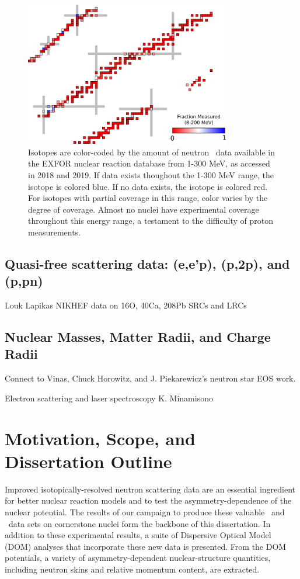 \begin{figure}[h]
    \centering
    \includegraphics[width=0.8\textwidth]{figures/RCSChart.png}
    \caption[Landscape of existing proton \rxn\ data in 2019]
    {Isotopes are color-coded by the amount of neutron \tot\ data available in the EXFOR nuclear
        reaction database from 1-300 MeV, as accessed in 2018 and 2019. If data exists thoughout the 1-300 MeV range, the isotope
        is colored blue. If no data exists, the isotope is colored red. For
        isotopes with partial coverage in this range, color varies by the degree
        of coverage. Almost no nuclei have experimental coverage throughout this energy
        range, a testament to the difficulty of proton \rxn measurements.}
    \label{RCSChart}
\end{figure}



\subsection{Quasi-free scattering data: (e,e'p), (p,2p), and (p,pn)}
Louk Lapikas
NIKHEF data on 16O, 40Ca, 208Pb
SRCs and LRCs

\subsection{Nuclear Masses, Matter Radii, and Charge Radii}
Connect to Vinas, Chuck Horowitz, and J. Piekarewicz's neutron star EOS work.

Electron scattering and laser spectroscopy
K. Minamisono

\section{Motivation, Scope, and Dissertation Outline}
Improved isotopically-resolved neutron scattering data are an essential ingredient
for better nuclear reaction models and to test the asymmetry-dependence of the
nuclear potential. The results of our campaign to produce these valuable
\tot\ and \el\ data sets on cornerstone nuclei form the backbone of this dissertation.
In addition to these experimental results, a suite of Dispersive Optical Model (DOM) analyses that 
incorporate these new data is presented. From the DOM potentials, a variety of asymmetry-dependent 
nuclear-structure quantities, including neutron skins and relative momentum
content, are extracted.

